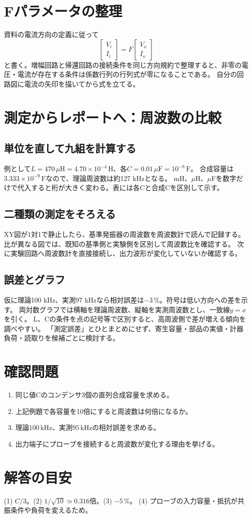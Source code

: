 \documentclass[lualatex,a4paper,10pt]{jlreq}
\begin{document}
\section{Fパラメータの整理}\label{sec:auto6}
資料の電流方向の定義に従って
\[
 \begin{bmatrix}V_i\\I_i\end{bmatrix}
 =F\begin{bmatrix}V_o\\I_o\end{bmatrix}
\]
と書く。増幅回路と帰還回路の接続条件を同じ方向規約で整理すると、非零の電圧・電流が存在する条件は係数行列の行列式が零になることである。
自分の回路図に電流の矢印を描いてから式を立てる。
\section{測定からレポートへ：周波数の比較}\label{sec:auto7}
\subsection{単位を直して九組を計算する}
例として$L=470\,\mu\mathrm{H}=4.70\times10^{-4}\,\mathrm{H}$、各$C=0.01\,\mu\mathrm{F}=10^{-8}\,\mathrm{F}$。
合成容量は$3.333\times10^{-9}\,\mathrm{F}$なので、理論周波数は約127 kHzとなる。
mH、$\mu$H、$\mu$Fを数字だけで代入すると桁が大きく変わる。表には各Cと合成Cを区別して示す。
\subsection{二種類の測定をそろえる}
XY図が1対1で静止したら、基準発振器の周波数を周波数計で読んで記録する。
比が異なる図では、既知の基準側と実験側を区別して周波数比を確認する。
次に実験回路へ周波数計を直接接続し、出力波形が変化していないか確認する。
\subsection{誤差とグラフ}
仮に理論100 kHz、実測97 kHzなら相対誤差は$-3\,\%$。符号は低い方向への差を示す。
両対数グラフでは横軸を理論周波数、縦軸を実測周波数とし、一致線$y=x$を引く。
L、Cの条件を点の記号等で区別すると、高周波側で差が増える傾向を調べやすい。
「測定誤差」とひとまとめにせず、寄生容量・部品の実値・計器負荷・読取りを候補ごとに検討する。

\clearpage
\clearpage
\section{確認問題}\label{sec:auto8}
\begin{enumerate}
\item 同じ値Cのコンデンサ3個の直列合成容量を求める。\answerline
\item 上記例題で各容量を10倍にすると周波数は何倍になるか。\answerline
\item 理論$100\,\mathrm{kHz}$、実測$95\,\mathrm{kHz}$の相対誤差を求める。\answerline
\item 出力端子にプローブを接続すると周波数が変化する理由を挙げる。\answerline
\end{enumerate}
\section*{解答の目安}\label{sec:auto9}
(1) $C/3$。(2) $1/\sqrt{10}\simeq0.316$倍。(3) $-5\,\%$。
(4) プローブの入力容量・抵抗が共振条件や負荷を変えるため。
\prelabclosing
\end{document}
